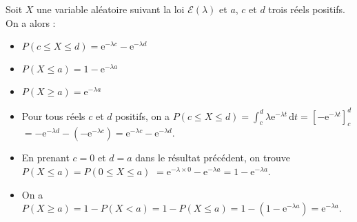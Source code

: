 \documentclass{cornouaille}
\begin{document}
\begin{propriete}
Soit $X$ une variable aléatoire suivant la loi $\mathcal{E}\left(\lambda\right)$ et $a$, $c$ et $d$ trois réels positifs. On a alors :

\begin{minipage}{0.39\linewidth}
  \begin{itemize}
  \item ${P\left(c\leqslant X\leqslant d\right)=\textrm{e}^{-\lambda c}-\textrm{e}^{-\lambda d}}$
\end{itemize}
\end{minipage}
\hfill
\begin{minipage}{0.31\linewidth}
  \begin{itemize}
  \item $P\left(X \leqslant a \right)=1-\textrm{e}^{-\lambda a}$
\end{itemize}
\end{minipage}
\hfill
\begin{minipage}{0.25\linewidth}
  \begin{itemize}
  \item $P\left(X \geqslant a \right)=\textrm{e}^{-\lambda a}$
\end{itemize}
\end{minipage}





\end{propriete}

\begin{preuve}
\begin{itemize}
\item Pour tous réels $c$ et $d$ positifs, on a $P(c\leqslant X \leqslant d)=\displaystyle \int_{c}^{d} \lambda\textrm{e}^{-\lambda t} \, \textrm{d}t=\left[-\textrm{e}^{-\lambda t}\right]_{c}^{d}$ ${=-\textrm{e}^{-\lambda d}-\left(-\textrm{e}^{-\lambda c}\right)=\textrm{e}^{-\lambda c}-\textrm{e}^{-\lambda d}}$.
\item En prenant $c=0$ et $d=a$ dans le résultat précédent, on trouve $P\left(X \leqslant a \right)=P\left(0 \leqslant X \leqslant a \right)$ ${=\textrm{e}^{-\lambda \times 0}-\textrm{e}^{-\lambda a}=1-\textrm{e}^{-\lambda a}}$.
\item On a $P\left(X \geqslant a \right)=1-P\left(X<a\right)=1-P\left(X\leqslant a\right)=1-\left(1-\textrm{e}^{-\lambda a}\right)=\textrm{e}^{-\lambda a}$.
\end{itemize}
\end{preuve}
\end{document}

